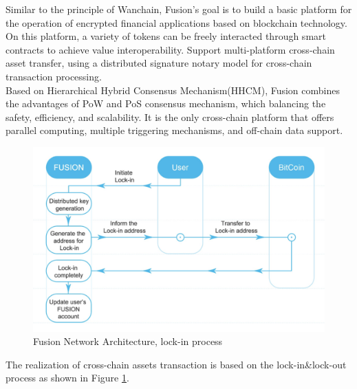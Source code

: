 \noindent Similar to the principle of Wanchain, Fusion's goal is to build a basic platform for the operation of encrypted financial applications based on blockchain technology. On this platform, a variety of tokens can be freely interacted through smart contracts to achieve value interoperability. Support multi-platform cross-chain asset transfer, using a distributed signature notary model for cross-chain transaction processing.\\
\noindent Based on Hierarchical Hybrid Consensus Mechanism(HHCM), Fusion combines the advantages of PoW and PoS consensus mechanism, which balancing the safety, efficiency, and scalability. It is the only cross-chain platform that offers parallel computing, multiple triggering mechanisms, and off-chain data support.\\

        \begin{figure}[H]
        \includegraphics[width=1\textwidth]{./figures/lockin}
        \centering
        \caption{{Fusion Network Architecture, lock-in process}\protect\footnotemark}
        \centering
        \label{fig:lockin}
        
        \end{figure}
\noindent The realization of cross-chain assets transaction is based on the lock-in\&lock-out process as shown in Figure \ref{fig:lockin}.
